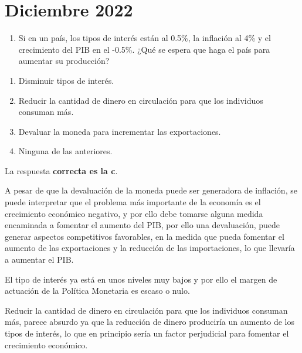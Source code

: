\documentclass[
  letterpaper,
  DIV=11,
  numbers=noendperiod]{scrreprt}
\providecommand{\tightlist}{%
  \setlength{\itemsep}{0pt}\setlength{\parskip}{0pt}}\usepackage{longtable,booktabs,array}
\begin{document}
\hypertarget{diciembre-2022}{%
\chapter*{Diciembre 2022}\label{diciembre-2022}}


\begin{enumerate}
\def\labelenumi{\arabic{enumi}.}
\tightlist
\item
  Si en un país, los tipos de interés están al 0.5\%, la inflación al
  4\% y el crecimiento del PIB en el -0.5\%. ¿Qué se espera que haga el
  país para aumentar su producción?
\end{enumerate}

\begin{enumerate}
\def\labelenumi{\alph{enumi})}
\item
  Disminuir tipos de interés.
\item
  Reducir la cantidad de dinero en circulación para que los individuos
  consuman más.
\item
  Devaluar la moneda para incrementar las exportaciones.
\item
  Ninguna de las anteriores.
\end{enumerate}

\begin{tcolorbox}[enhanced jigsaw, opacityback=0, bottomrule=.15mm, colframe=quarto-callout-tip-color-frame, arc=.35mm, leftrule=.75mm, breakable, colback=white, rightrule=.15mm, toprule=.15mm, left=2mm]
\begin{minipage}[t]{5.5mm}
\textcolor{quarto-callout-tip-color}{\faLightbulb}
\end{minipage}%
\begin{minipage}[t]{\textwidth - 5.5mm}

La respuesta \textbf{correcta es la c}.

A pesar de que la devaluación de la moneda puede ser generadora de
inflación, se puede interpretar que el problema más importante de la
economía es el crecimiento económico negativo, y por ello debe tomarse
alguna medida encaminada a fomentar el aumento del PIB, por ello una
devaluación, puede generar aspectos competitivos favorables, en la
medida que pueda fomentar el aumento de las exportaciones y la reducción
de las importaciones, lo que llevaría a aumentar el PIB.

El tipo de interés ya está en unos niveles muy bajos y por ello el
margen de actuación de la Política Monetaria es escaso o nulo.

Reducir la cantidad de dinero en circulación para que los individuos
consuman más, parece absurdo ya que la reducción de dinero produciría un
aumento de los tipos de interés, lo que en principio sería un factor
perjudicial para fomentar el crecimiento económico.

\end{minipage}%
\end{tcolorbox}
\end{document}
